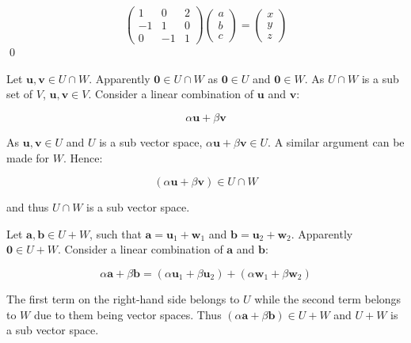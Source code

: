 \documentclass[12pt]{article}
\begin{document}
\begin{equation}
    \begin{pmatrix}
        1  & 0  & 2 \\
        -1 & 1  & 0 \\
        0  & -1 & 1
    \end{pmatrix}
    \begin{pmatrix}
        a \\
        b \\
        c
    \end{pmatrix} =
    \begin{pmatrix}
        x \\
        y \\
        z
    \end{pmatrix}
\end{equation}
\qed



Let $\mathbf{u}, \mathbf{v} \in U \cap W$. Apparently $\mathbf{0} \in U \cap W$ as $\mathbf{0} \in U$ and $\mathbf{0} \in W$. As $U \cap W$ is a sub set of $V$, $\mathbf{u}, \mathbf{v} \in V$. Consider a linear combination of $\mathbf{u}$ and $\mathbf{v}$:

\begin{equation}
    \alpha \mathbf{u} + \beta \mathbf{v}
\end{equation}

As $\mathbf{u}, \mathbf{v} \in U$ and $U$ is a sub vector space, $\alpha \mathbf{u} + \beta \mathbf{v} \in U$. A similar argument can be made for $W$. Hence:

\begin{equation}
    (\alpha \mathbf{u} + \beta \mathbf{v}) \in U \cap W
\end{equation}

and thus $U \cap W$ is a sub vector space.

Let $\mathbf{a}, \mathbf{b} \in U + W$, such that $\mathbf{a} = \mathbf{u}_{1} + \mathbf{w}_{1}$ and $\mathbf{b} = \mathbf{u}_{2} + \mathbf{w}_{2}$. Apparently $\mathbf{0} \in U + W$. Consider a linear combination of $\mathbf{a}$ and $\mathbf{b}$:

\begin{equation}
    \alpha \mathbf{a} + \beta \mathbf{b} = (\alpha \mathbf{u}_{1} + \beta \mathbf{u}_{2}) + (\alpha \mathbf{w}_{1} + \beta \mathbf{w}_{2})
\end{equation}

The first term on the right-hand side belongs to $U$ while the second term belongs to $W$ due to them being vector spaces. Thus $(\alpha \mathbf{a} + \beta \mathbf{b}) \in U + W$ and $U + W$ is a sub vector space.
\end{document}
